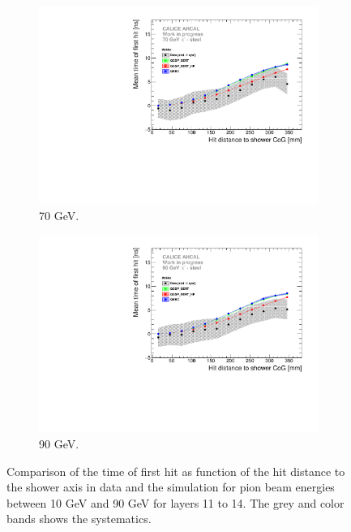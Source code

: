 \begin{figure}[htbp!]
\begin{subfigure}[t]{0.5\textwidth}
    \includegraphics[width=1\textwidth]{../Thesis_Plots/Timing/Pions/Plots/ComparisonToSim/Time_Radius_70GeV_BL_Mokka.pdf}
    \caption{70 GeV.} \label{fig:Radius_SSF_SimData_70GeV}
  \end{subfigure}
  \hfill
  \begin{subfigure}[t]{0.5\textwidth}
    \centering
    \includegraphics[width=1\textwidth]{../Thesis_Plots/Timing/Pions/Plots/ComparisonToSim/Time_Radius_90GeV_BL_Mokka.pdf}
    \caption{90 GeV.} \label{fig:Radius_SSF_SimData_90GeV}
  \end{subfigure}
  \caption{Comparison of the time of first hit as function of the hit distance to the shower axis in data and the \mokka simulation for pion beam energies between 10 GeV and 90 GeV for layers 11 to 14. The grey and color bands shows the systematics.}
\end{figure}

